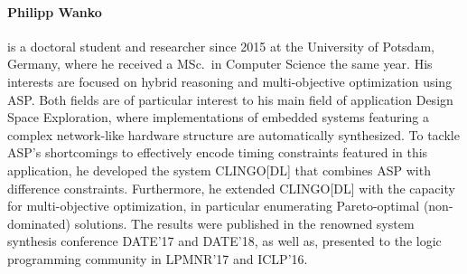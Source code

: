 \documentclass{article}
\begin{document}
\paragraph{Philipp Wanko}
%
is a doctoral student and researcher since 2015 at the University of Potsdam, Germany,
where he received a  MSc.\ in Computer Science the same year.
His interests are focused on hybrid reasoning and multi-objective optimization using ASP.
Both fields are of particular interest to his main field of application Design Space Exploration,
where implementations of embedded systems featuring a complex network-like hardware structure are automatically synthesized.
To tackle ASP's shortcomings to effectively encode timing constraints featured in this application,
he developed the system CLINGO[DL] that combines ASP with difference constraints.
Furthermore, he extended CLINGO[DL] with the capacity for multi-objective optimization,
in particular enumerating Pareto-optimal (non-dominated) solutions.
The results were published in the renowned system synthesis conference DATE'17 and DATE'18,
as well as, presented to the logic programming community in LPMNR'17 and ICLP'16.
\end{document}
